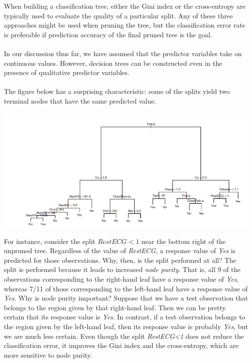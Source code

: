 When building a classification tree, either the Gini index or the cross-entropy are typically used to evaluate the quality of a particular split. Any of these three approaches might be used when pruning the tree, but the classification error rate is preferable if prediction accuracy of the final pruned tree is the goal.\\\\
In our discussion thus far, we have assumed that the predictor variables take on continuous values. However, decision trees can be constructed even in the presence of qualitative predictor variables.\\\\
The figure below has a surprising characteristic: some of the splits yield two terminal nodes that have the same predicted value.
\begin{center}
    \includegraphics[scale=0.8]{images/classification-tree.png}
\end{center}
For instance, consider the split $RestECG<1$ near the bottom right of the unpruned tree. Regardless of the value of \textit{RestECG}, a response value of \textit{Yes} is predicted for those observations. Why, then, is the split performed at all? The split is performed because it leads to increased \textit{node purity}. That is, all 9 of the observations corresponding to the right-hand leaf have a response value of \textit{Yes}, whereas 7/11 of those corresponding to the left-hand leaf have a response value of \textit{Yes}. Why is node purity important? Suppose that we have a test observation that belongs to the region given by that right-hand leaf. Then we can be pretty certain that its response value is \textit{Yes}. In contrast, if a test observation belongs to the region given by the left-hand leaf, then its response value is probably \textit{Yes}, but we are much less certain. Even though the split \textit{RestECG<1} does not reduce the classification error, it improves the Gini index and the cross-entropy, which are more sensitive to node purity.

